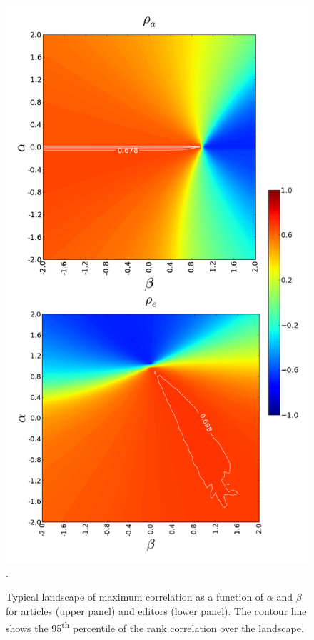 \begin{figure}[!t]
\centering
\includegraphics[width=0.9\columnwidth]{Figures/contour_fem_combined.png}.
\caption{Typical landscape of maximum correlation as a function of $\alpha$ and $\beta$ for articles (upper panel) and editors (lower panel). The contour line shows the 95\textsuperscript{th} percentile of the rank correlation over the landscape.}
\label{fig:landscape}
\end{figure}



